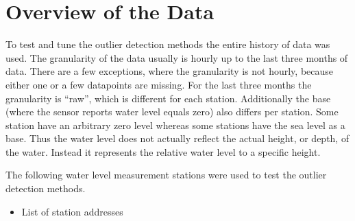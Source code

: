 \section{Overview of the Data}
To test and tune the outlier detection methods the entire history of data was used. The granularity of the data usually is hourly up to the last three months of data. There are a few exceptions, where the granularity is not hourly, because either one or a few datapoints are missing. For the last three months the granularity is ``raw'', which is different for each station. Additionally the base (where the sensor reports water level equals zero) also differs per station. Some station have an arbitrary zero level whereas some stations have the sea level as a base. Thus the water level does not actually reflect the actual height, or depth, of the water. Instead it represents the relative water level to a specific height.
\par
The following water level measurement stations were used to test the outlier detection methods.
\begin{itemize}
    \item List of station addresses  
\end{itemize}


